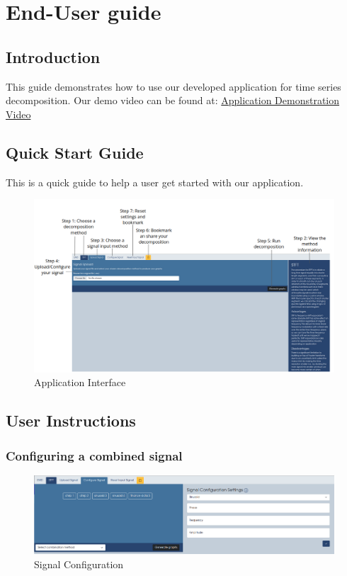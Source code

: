 \section{End-User guide}
\subsection{Introduction}
This guide demonstrates how to use our developed application for time series decomposition.
Our demo video can be found at: 
\href{https://www.overleaf.com/learn}{Application Demonstration Video}

\subsection{Quick Start Guide}
This is a quick guide to help a user get started with our application.
\begin{figure}[H]
\centering
\includegraphics[width=1.0\textwidth]{figures/quickguidesteps.png}
\caption{\label{fig:Application Interface}Application Interface}
\end{figure}


\subsection{User Instructions}
\subsubsection{Configuring a combined signal}
\begin{figure}[H]
\centering
\includegraphics[width=1.0\textwidth]{figures/signalconfig.png}
\caption{\label{fig:Signal Configuration}Signal Configuration}
\end{figure}

